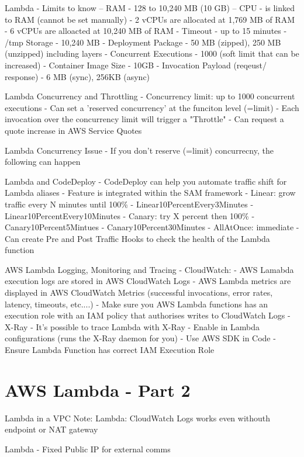 Lambda - Limits to know
-- RAM - 128 to 10,240 MB (10 GB)
-- CPU - is linked to RAM (cannot be set manually)
- 2 vCPUs are allocated at 1,769 MB of RAM
- 6 vCPUs are alloacted at 10,240 MB of RAM
- Timeout - up to 15 minutes
- /tmp Storage - 10,240 MB
- Deployment Package - 50 MB (zipped), 250 MB (unzipped) including layers
- Concurrent Executions - 1000 (soft limit that can be increased)
- Container Image Size - 10GB
- Invocation Payload (reqeust/ response) - 6 MB (sync), 256KB (async)

Lambda Concurrency and Throttling
- Concurrency limit: up to 1000 concurrent executions
- Can set a 'reserved concurrency' at the funciton level (=limit)
- Each invocation over the concurrency limit will trigger a "Throttle"
- Can request a quote increase in AWS Service Quotes

Lambda Concurrency Issue
- If you don't reserve (=limit) concurrecny, the following can happen

Lambda and CodeDeploy
- CodeDeploy can help you automate traffic shift for Lambda aliases
- Feature is integrated within the SAM framework
- Linear: grow traffic every N minutes until 100\%
- Linear10PercentEvery3Minutes
- Linear10PercentEvery10Minutes
- Canary: try X percent then 100\%
- Canary10Percent5Mintues
- Canary10Percent30Minutes
- AllAtOnce: immediate
- Can create Pre and Post Traffic Hooks to check the health of the Lambda function

AWS Lambda Logging, Monitoring and Tracing
- CloudWatch:
- AWS Lamabda execution logs are stored in AWS CloudWatch Logs
- AWS Lambda metrics are displayed in AWS CloudWatch Metrics (successful invocations, error rates, latency, timeouts, etc....)
- Make sure you AWS Lambda functions has an execution role with an IAM policy that authorises writes to CloudWatch Logs
- X-Ray
- It's possible to trace Lambda with X-Ray
- Enable in Lambda configurations (runs the X-Ray daemon for you)
- Use AWS SDK in Code
- Ensure Lambda Function has correct IAM Execution Role


\section{AWS Lambda - Part 2}
Lambda in a VPC
Note: Lambda: CloudWatch Logs works even withouth endpoint or NAT gateway

Lambda - Fixed Public IP for external comms

